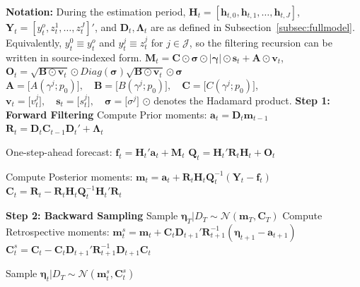 \documentclass[APA,STIX1COL]{WileyNJD-v2}
\begin{document}
\begin{algorithm}
\caption{MCMC - Forward Filtering Backward Sampling (FFBS)}
\label{alg:Alg2}
\begin{algorithmic}

\State \textbf{Notation:}
\State  During the estimation period, \(\mathbf{H}_t = [\mathbf{h}_{t,0}, \mathbf{h}_{t,1}, \ldots, \mathbf{h}_{t,J}]\), \(\mathbf{Y}_t = [y_t^o, z_t^1, \ldots, z_t^J]'\), and \(\mathbf{D}_t, \boldsymbol{\Lambda}_t\) are as defined in Subsection~\ref{subsec:fullmodel}.
\State  Equivalently, \(y_t^0 \equiv y_t^o\) and \(y_t^j \equiv z_t^j\) for \(j\in\mathcal{J}\), so the filtering recursion can be written in source-indexed form.
\State $\mathbf{M}_t= \mathbf{C} \odot  \mathbf{\sigma} \odot | \mathbf{\gamma} | \odot \mathbf{s}_t + \mathbf{A} \odot \mathbf{v}_t$, \quad $\mathbf{O}_t= \sqrt{\mathbf{B} \odot \mathbf{v}_t} \odot Diag
(\mathbf{\sigma}) \sqrt{\mathbf{B} \odot \mathbf{v}_t} \odot \mathbf{\sigma}$
\State  \(
\mathbf{A} = \big[ A(\gamma^j;p_0)   \big], \quad \mathbf{B} = \big[  B(\gamma^j;p_0)  \big], \quad \mathbf{C} = \big[ C(\gamma^j;p_0)   \big] \), 
\State \( \mathbf{v}_t = \big[  v^j_t   \big], \quad  \mathbf{s}_t = \big[ 
s^j_t  \big] , \quad \mathbf{\sigma} = \big[ \sigma^j  \big]
\)
\State \(\odot\) denotes the Hadamard product.
\State \textbf{Step 1: Forward Filtering}
    \State Compute Prior moments:
    \State $\mathbf{a}_t = \mathbf{D}_t \mathbf{m}_{t-1}$
    \State $\mathbf{R}_t = \mathbf{D}_t \mathbf{C}_{t-1} \mathbf{D}_t' +  \boldsymbol{\Lambda}_t$

    \State One-step-ahead forecast:
    \State $\mathbf{f}_t = \mathbf{H}_t' \mathbf{a}_t + \mathbf{M}_t$
    \State $\mathbf{Q}_t = \mathbf{H}_t' \mathbf{R}_t \mathbf{H}_t + \mathbf{O}_t$
    
    \State Compute Posterior moments:
    \State $\mathbf{m}_t = \mathbf{a}_t + \mathbf{R}_t \mathbf{H}_t \mathbf{Q}_t^{-1}(\mathbf{Y}_t - \mathbf{f}_t)$
    \State $\mathbf{C}_t = \mathbf{R}_t - \mathbf{R}_t \mathbf{H}_t \mathbf{Q}_t^{-1} \mathbf{H}_t' \mathbf{R}_t$
\EndFor

\State \textbf{Step 2: Backward Sampling}
        \State Sample $\boldsymbol{\eta}_T | D_T \sim \mathcal{N}(\mathbf{m}_T, \mathbf{C}_T)$
    \Else
        \State Compute Retrospective moments:
        \State $\mathbf{m}_t^s = \mathbf{m}_t + \mathbf{C}_t \mathbf{D}_{t+1}' \mathbf{R}_{t+1}^{-1} (\boldsymbol{\eta}_{t+1} - \mathbf{a}_{t+1})$
        \State $\mathbf{C}_t^s = \mathbf{C}_t - \mathbf{C}_t \mathbf{D}_{t+1}' \mathbf{R}_{t+1}^{-1} \mathbf{D}_{t+1} \mathbf{C}_t$
        
        \State Sample $\boldsymbol{\eta}_t | D_T \sim \mathcal{N}(\mathbf{m}_t^s, \mathbf{C}_t^s)$
    \EndIf
\EndFor

\end{algorithmic}
\end{algorithm}
\end{document}
